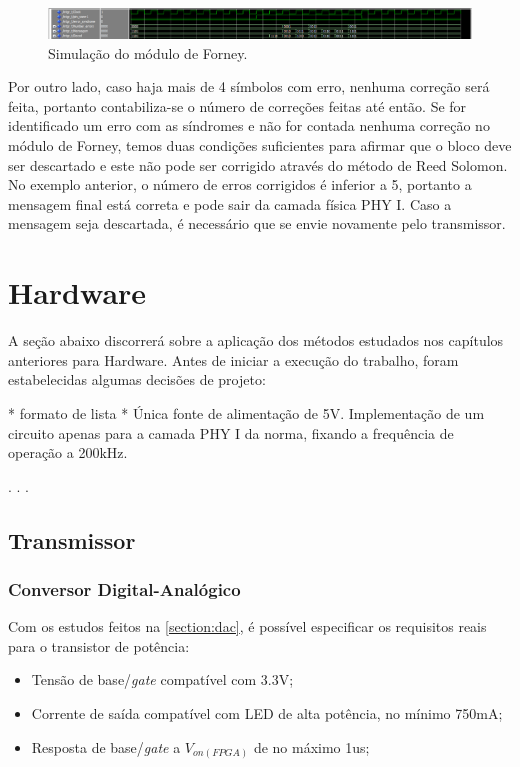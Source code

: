 	\begin{figure}[!htb]
		\caption{\label{fig_forney_sim}Simulação do módulo de Forney.}
		\centering
		\includegraphics[width=1\textwidth]{RS/Sim_forney.PNG}
		\legend{}
	\end{figure}
	
	Por outro lado, caso haja mais de 4 símbolos com erro, nenhuma correção será feita, portanto contabiliza-se o número de correções feitas até então. Se for identificado um erro com as síndromes e não for contada nenhuma correção no módulo de Forney, temos duas condições suficientes para afirmar que o bloco deve ser descartado e este não pode ser corrigido através do método de Reed Solomon. No exemplo anterior, o número de erros corrigidos é inferior a 5, portanto a mensagem final está correta e pode sair da camada física PHY I. Caso a mensagem seja descartada, é necessário que se envie novamente pelo transmissor.	
	

	
	\section{Hardware}
	A seção abaixo discorrerá sobre a aplicação dos métodos estudados nos capítulos anteriores para Hardware.
	Antes de iniciar a execução do trabalho, foram estabelecidas algumas decisões de projeto:
	
	* formato de lista *
	Única fonte de alimentação de 5V.
	Implementação de um circuito apenas para a camada PHY I da norma, fixando a frequência de operação a 200kHz.
	
	. . .
	
	\subsection{Transmissor}
	
	\subsubsection{Conversor Digital-Analógico}
	Com os estudos feitos na \autoref{section:dac}, é possível especificar os requisitos reais para o transistor de potência:

	\begin{itemize}
		\item Tensão de base/\textit{gate} compatível com 3.3V;
		\item Corrente de saída compatível com LED de alta potência, no mínimo 750mA;
		\item Resposta de base/\textit{gate} a $V_{on(FPGA)}$ de no máximo 1us;
	\end{itemize}
	
